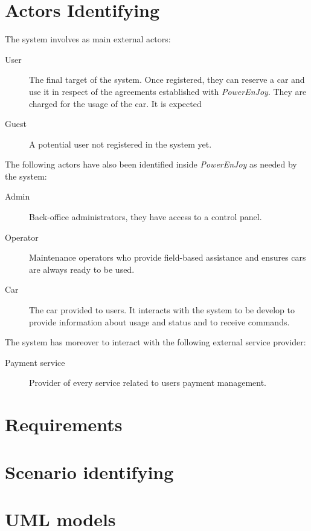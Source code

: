 \documentclass{article}
\begin{document}
	\section{Actors Identifying}
		The system involves as main external actors:
		\begin{description}
			\item[User] The final target of the system. Once registered, they can reserve a car and use it in respect of the agreements established with \textit{PowerEnJoy}. They are charged for the usage of the car. It is expected

			\item[Guest] A potential user not registered in the system yet.
		\end{description}
		The following actors have also been identified inside \textit{PowerEnJoy} as needed by the system:
		\begin{description}
			\item[Admin] Back-office administrators, they have access to a control panel.

			\item[Operator] Maintenance operators who provide field-based assistance and ensures cars are always ready to be used.

			\item[Car] The car provided to users. It interacts with the system to be develop to provide information about usage and status and to receive commands.
		\end{description}
		The system has moreover to interact with the following external service provider:
		\begin{description}
			\item[Payment service] Provider of every service related to users payment management.
		\end{description}

	\newpage
	\section{Requirements}

	\newpage
	\section{Scenario identifying}
	
		

	\newpage
	\section{UML models}
	
\end{document}

